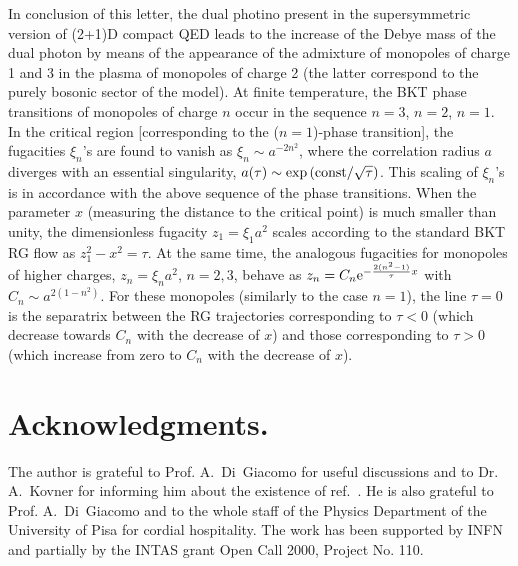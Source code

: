 \documentclass[a4paper,12pt]{article}
\begin{document}
In conclusion of this letter, the dual photino present in the supersymmetric version of (2+1)D compact QED
leads to the increase of the Debye mass of the dual photon by means of the appearance of
the admixture of monopoles of charge 1 and 3 in the plasma of monopoles of charge 2 (the latter correspond
to the purely bosonic sector of the model). At finite temperature, the BKT phase transitions
of monopoles of charge $n$ occur in the sequence $n=3$, $n=2$, $n=1$. In the critical region [corresponding
to the ($n=1$)-phase transition], the fugacities $\xi_n$'s are found to vanish as
$\xi_n\sim a^{-2n^2}$, where the correlation radius $a$ diverges with an essential singularity,
$a(\tau)\sim\exp\left({\rm const}/\sqrt{\tau}\right)$. This scaling of $\xi_n$'s is in accordance with
the above sequence of the phase transitions.
When the parameter $x$ (measuring the distance to the
critical point) is much smaller than unity, the dimensionless fugacity $z_1=\xi_1a^2$ scales according to the standard BKT RG flow
as $z_1^2-x^2=\tau$. At the same time, the analogous fugacities for monopoles of higher charges, $z_n=\xi_na^2$, $n=2,3$,
behave as $z_n=C_n{\rm e}^{-\frac{2(n^2-1)}{\tau}x}$ with $C_n\sim a^{2(1-n^2)}$. For these monopoles (similarly to the case $n=1$),
the line $\tau=0$ is the separatrix
between the RG trajectories corresponding to $\tau<0$ (which decrease towards $C_n$ with the
decrease of $x$) and those corresponding to $\tau>0$ (which increase from zero to
$C_n$ with the decrease of $x$).



\section{Acknowledgments.}
The author is grateful
to Prof. A.~Di~Giacomo for useful discussions and to Dr. A.~Kovner for informing him about the existence of
ref.~\cite{ahw}.
He is also grateful to
Prof. A.~Di~Giacomo and to the whole staff of the Physics Department of the
University of Pisa for cordial hospitality.
The work has been supported by INFN and partially by
the INTAS grant Open Call 2000, Project No. 110.
\end{document}

